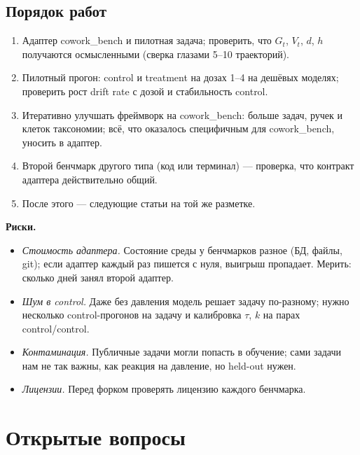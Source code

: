 \documentclass[11pt,a4paper]{article}
\begin{document}
\subsection*{Порядок работ}

\begin{enumerate}
  \item Адаптер cowork\_bench и пилотная задача; проверить, что $G_t$, $V_t$, $d$, $h$ получаются осмысленными (сверка глазами 5--10 траекторий).
  \item Пилотный прогон: control и treatment на дозах 1--4 на дешёвых моделях; проверить рост drift rate с дозой и стабильность control.
  \item Итеративно улучшать фреймворк на cowork\_bench: больше задач, ручек и клеток таксономии; всё, что оказалось специфичным для cowork\_bench, уносить в адаптер.
  \item Второй бенчмарк другого типа (код или терминал) --- проверка, что контракт адаптера действительно общий.
  \item После этого --- следующие статьи на той же разметке.
\end{enumerate}

\textbf{Риски.}
\begin{itemize}
  \item \emph{Стоимость адаптера.} Состояние среды у бенчмарков разное (БД, файлы, git); если адаптер каждый раз пишется с нуля, выигрыш пропадает. Мерить: сколько дней занял второй адаптер.
  \item \emph{Шум в control.} Даже без давления модель решает задачу по-разному; нужно несколько control-прогонов на задачу и калибровка $\tau$, $k$ на парах control/control.
  \item \emph{Контаминация.} Публичные задачи могли попасть в обучение; сами задачи нам не так важны, как реакция на давление, но held-out нужен.
  \item \emph{Лицензии.} Перед форком проверять лицензию каждого бенчмарка.
\end{itemize}

\section{Открытые вопросы}
\end{document}
